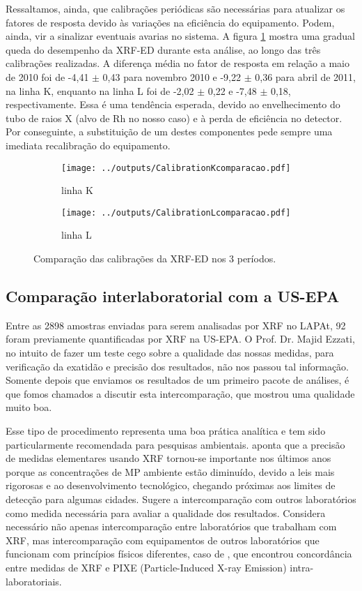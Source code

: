 Ressaltamos, ainda, que calibrações periódicas são necessárias para atualizar os
fatores de resposta devido às variações na eficiência do equipamento. Podem, 
ainda, vir a sinalizar eventuais avarias no sistema.
A figura \ref{fig:compara_calibracao} mostra uma gradual queda do desempenho 
da XRF-ED durante esta análise, ao longo das três calibrações realizadas. 
A diferença média no fator de resposta em relação a maio de 2010 foi de 
-4,41 $\pm$ 0,43 para novembro 2010 e -9,22 $\pm$ 0,36 para abril de 2011, 
na linha K, enquanto na linha L foi de -2,02 $\pm$ 0,22 e -7,48 $\pm$ 0,18, 
respectivamente. Essa é uma tendência esperada, devido ao envelhecimento do tubo
de raios X (alvo de Rh no nosso caso) e à perda de eficiência no detector. 
Por conseguinte, a substituição de um destes componentes pede sempre uma 
imediata recalibração do equipamento.

\begin{figure}[H]
  \begin{subfigure}[b]{0.5\textwidth}
    \texttt{[image: ../outputs/CalibrationKcomparacao.pdf]}
    \caption{linha K}
  \end{subfigure}%
  \begin{subfigure}[b]{0.5\textwidth}
    \texttt{[image: ../outputs/CalibrationLcomparacao.pdf]}
    \caption{linha L}
  \end{subfigure}
  \caption{Comparação das calibrações da XRF-ED nos 3 períodos. 
          \label{fig:compara_calibracao}}
\end{figure}

\subsection{Comparação interlaboratorial com a US-EPA}

Entre as 2898 amostras enviadas para serem analisadas por XRF no LAPAt, 
92 foram previamente quantificadas por XRF na US-EPA.  O Prof. Dr. Majid Ezzati, 
no intuito de fazer um teste cego sobre a qualidade das nossas medidas, 
para verificação da exatidão e precisão dos resultados, não nos passou tal 
informação. Somente depois que enviamos os resultados de um primeiro pacote de 
análises, é que fomos chamados a discutir esta intercomparação, que mostrou uma 
qualidade muito boa. 

Esse tipo de procedimento representa uma boa prática analítica e tem sido 
particularmente recomendada para pesquisas ambientais. \citet{kang2014} aponta 
que a precisão de medidas elementares usando XRF tornou-se importante nos 
últimos anos porque as concentrações de MP ambiente estão diminuído, devido a 
leis mais rigorosas e ao desenvolvimento tecnológico, chegando próximas aos 
limites de detecção para algumas cidades. Sugere a intercomparação com outros 
laboratórios como medida necessária para avaliar a qualidade dos resultados. 
Considera necessário não apenas intercomparação entre laboratórios que 
trabalham com XRF, mas intercomparação com equipamentos de outros laboratórios 
que funcionam com princípios físicos diferentes, caso de \citet{nejedly1998}, 
que encontrou concordância entre medidas de XRF e PIXE 
(Particle-Induced X-ray Emission) intra-laboratoriais.

